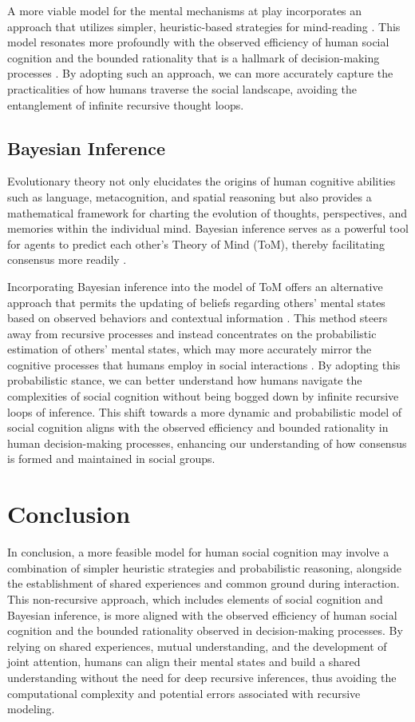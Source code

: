 \documentclass{article}
\begin{document}
A more viable model for the mental mechanisms at play incorporates an approach that utilizes simpler, heuristic-based strategies for mind-reading \citep{murphy2009beyond}. This model resonates more profoundly with the observed efficiency of human social cognition and the bounded rationality that is a hallmark of decision-making processes \citep{Simon1997}. By adopting such an approach, we can more accurately capture the practicalities of how humans traverse the social landscape, avoiding the entanglement of infinite recursive thought loops.

\subsection{Bayesian Inference}
Evolutionary theory not only elucidates the origins of human cognitive abilities such as language, metacognition, and spatial reasoning but also provides a mathematical framework for charting the evolution of thoughts, perspectives, and memories within the individual mind. Bayesian inference serves as a powerful tool for agents to predict each other's Theory of Mind (ToM), thereby facilitating consensus more readily \citep{suchow2017evolution}.

Incorporating Bayesian inference into the model of ToM offers an alternative approach that permits the updating of beliefs regarding others' mental states based on observed behaviors and contextual information \citep{Khalvati2019}. This method steers away from recursive processes and instead concentrates on the probabilistic estimation of others' mental states, which may more accurately mirror the cognitive processes that humans employ in social interactions \citep{rabinowitz2018machine}. By adopting this probabilistic stance, we can better understand how humans navigate the complexities of social cognition without being bogged down by infinite recursive loops of inference. This shift towards a more dynamic and probabilistic model of social cognition aligns with the observed efficiency and bounded rationality in human decision-making processes, enhancing our understanding of how consensus is formed and maintained in social groups.




\section{Conclusion}
In conclusion, a more feasible model for human social cognition may involve a combination of simpler heuristic strategies and probabilistic reasoning, alongside the establishment of shared experiences and common ground during interaction. This non-recursive approach, which includes elements of social cognition and Bayesian inference, is more aligned with the observed efficiency of human social cognition and the bounded rationality observed in decision-making processes. By relying on shared experiences, mutual understanding, and the development of joint attention, humans can align their mental states and build a shared understanding without the need for deep recursive inferences, thus avoiding the computational complexity and potential errors associated with recursive modeling.





\end{document}
